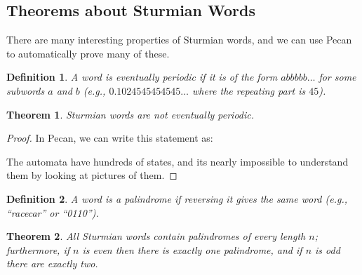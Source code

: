 \documentclass[landscape,usenames,dvipsnames]{sciposter}
\newtheorem{thm}{Theorem}%
\newtheorem*{defin}{Definition}
\begin{document}
\begin{multicols}{3}

\columnbreak

\section*{Theorems about Sturmian Words}

There are many interesting properties of Sturmian words, and we can use Pecan to automatically prove many of these.

\begin{defin}
    A word is eventually periodic if it is of the form $abbbbb \ldots$ for some subwords $a$ and $b$ (e.g., $0.1024545454545\ldots$ where the repeating part is $45$).
\end{defin}

\begin{mdframed}[style=MyFrame]
\begin{thm}
Sturmian words are not eventually periodic.
\end{thm}
\end{mdframed}
\begin{proof}
In Pecan, we can write this statement as:

The automata have hundreds of states, and its nearly impossible to understand them by looking at pictures of them.
\end{proof}

\begin{defin}
    A word is a palindrome if reversing it gives the same word (e.g., ``racecar'' or ``0110'').
\end{defin}

\begin{mdframed}[style=MyFrame]
\begin{thm}
All Sturmian words contain palindromes of every length $n$; furthermore, if $n$ is even then there is exactly one palindrome, and if $n$ is odd there are exactly two.
\end{thm}
\end{mdframed}


\end{multicols}
\end{document}

